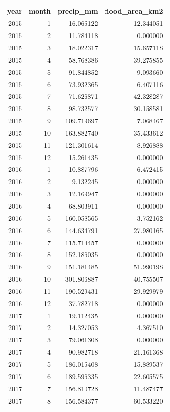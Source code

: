 \begin{tabular}{rrrr}
\toprule
year & month & precip\_mm & flood\_area\_km2 \\
\midrule
2015 & 1 & 16.065122 & 12.344051 \\
2015 & 2 & 11.784118 & 0.000000 \\
2015 & 3 & 18.022317 & 15.657118 \\
2015 & 4 & 58.768386 & 39.275855 \\
2015 & 5 & 91.844852 & 9.093660 \\
2015 & 6 & 73.932365 & 6.407116 \\
2015 & 7 & 71.626871 & 42.328287 \\
2015 & 8 & 98.732577 & 30.158581 \\
2015 & 9 & 109.719697 & 7.068467 \\
2015 & 10 & 163.882740 & 35.433612 \\
2015 & 11 & 121.301614 & 8.926888 \\
2015 & 12 & 15.261435 & 0.000000 \\
2016 & 1 & 10.887796 & 6.472415 \\
2016 & 2 & 9.132245 & 0.000000 \\
2016 & 3 & 12.169947 & 0.000000 \\
2016 & 4 & 68.803911 & 0.000000 \\
2016 & 5 & 160.058565 & 3.752162 \\
2016 & 6 & 144.634791 & 27.980165 \\
2016 & 7 & 115.714457 & 0.000000 \\
2016 & 8 & 152.186035 & 0.000000 \\
2016 & 9 & 151.181485 & 51.990198 \\
2016 & 10 & 301.806887 & 40.755507 \\
2016 & 11 & 190.529431 & 29.929979 \\
2016 & 12 & 37.782718 & 0.000000 \\
2017 & 1 & 19.112435 & 0.000000 \\
2017 & 2 & 14.327053 & 4.367510 \\
2017 & 3 & 79.061308 & 0.000000 \\
2017 & 4 & 90.982718 & 21.161368 \\
2017 & 5 & 186.015408 & 15.889537 \\
2017 & 6 & 189.596335 & 22.605575 \\
2017 & 7 & 156.810728 & 11.487477 \\
2017 & 8 & 156.584377 & 60.533220 \\

\end{tabular}
